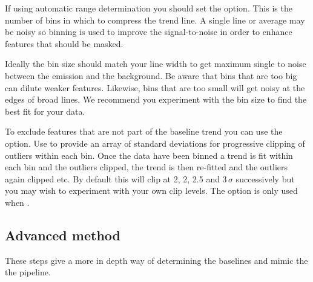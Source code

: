 \documentclass[11pt,oneside,chapters]{starlink}
\begin{document}
\begin{terminalv}
\end{terminalv}

If using automatic range determination you should set the
 option. This is the number of bins in which to compress
the trend line. A single line or average may be noisy so binning is
used to improve the signal-to-noise in order to enhance features that
should be masked.

Ideally the bin size should match your line width to get maximum
single to noise between the emission and the background. Be aware that
bins that are too big can dilute weaker features. Likewise, bins that
are too small will get noisy at the edges of broad lines. We recommend
you experiment with the bin size to find the best fit for your data.

To exclude features that are not part of the baseline trend you can
use the  option. Use  to provide an array of
standard deviations for progressive clipping of outliers within each
bin. Once the data have been binned a trend is fit within each bin and
the outliers clipped, the trend is then re-fitted and the outliers
again clipped etc. By default this will clip at 2, 2, 2.5 and
3\,$\sigma$ successively but you may wish to experiment with your own
clip levels. The  option is only used when
.

\subsection{Advanced method}
These steps give a more in depth way of determining the baselines and
mimic the the pipeline.
\end{document}
